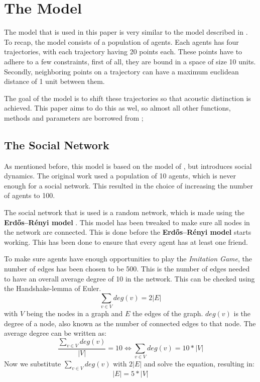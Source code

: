 \section{The Model}
The model that is used in this paper is very similar to the model described in \citep*{de2010multi}.
To recap, the model consists of a population of agents.
Each agents has four trajectories, with each trajectory having 20 points each.
These points have to adhere to a few constraints, first of all, they are bound in a space of size 10 units.
Secondly, neighboring points on a trajectory can have a maximum euclidean distance of 1 unit between them.

The goal of the model is to shift these trajectories so that acoustic distinction is achieved.
This paper aims to do this as wel, so almost all other functions, methods and parameters are borrowed from \cite*{de2010multi};

\subsection{The Social Network}
As mentioned before, this model is based on the model of \citeauthor{de2010multi}, but introduces social dynamics.
The original work used a population of 10 agents, which is never enough for a social network.
This resulted in the choice of increasing the number of agents to 100.

The social network that is used is a random network, which is made using the \textbf{Erdős–Rényi model} \citep*{erdos1959r}.
This model has been tweaked to make sure all nodes in the network are connected.
This is done before the \textbf{Erdős–Rényi model} starts working.
This has been done to ensure that every agent has at least one friend.

To make sure agents have enough opportunities to play the \textit{Imitation Game}, the number of edges has been chosen to be 500.
This is the number of edges needed to have an overall average degree of 10 in the network.
This can be checked using the Handshake-lemma of Euler.
\[
    \sum_{v \in V} deg(v) = 2 |E|
\]
with $V$ being the nodes in a graph and $E$ the edges of the graph.
$deg(v)$ is the degree of a node, also known as the number of connected edges to that node.
The average degree can be written as:
\[
    \frac{
        \sum_{v \in V} deg(v)
    }{|V|} = 10
    \Leftrightarrow
    \sum_{v \in V} deg(v) = 10 * |V|
\]
Now we substitute $\sum_{v \in V} deg(v)$ with $2|E|$ and solve the equation, resulting in:
\[    
    |E| = 5 * |V|
\]

